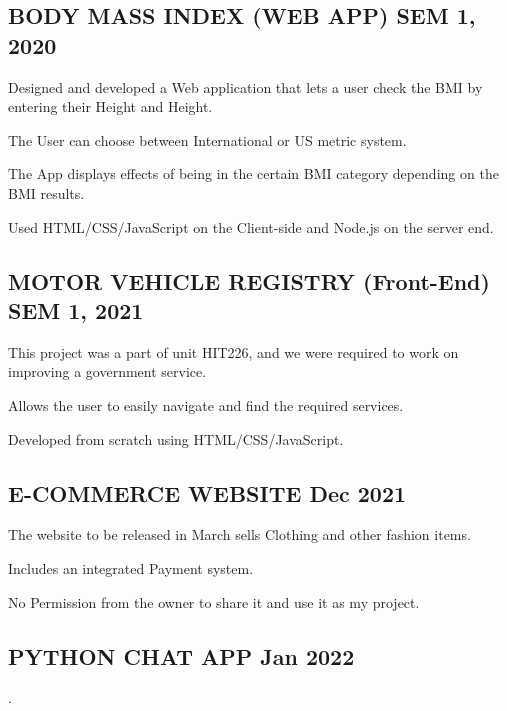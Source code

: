 \documentclass[letter,10pt]{article}
\begin{document}
\subsection{{BODY MASS INDEX (WEB APP) \hfill SEM 1, 2020}}
\begin{zitemize}
\item Designed and developed a Web application that lets a user check the BMI by entering their Height and Height.
\item The User can choose between International or US metric system.
\item The App displays effects of being in the certain BMI category depending on the BMI results.
\item Used HTML/CSS/JavaScript on the Client-side and Node.js on the server end.
\end{zitemize}

\subsection{{MOTOR VEHICLE REGISTRY (Front-End) \hfill SEM 1, 2021}}
\begin{zitemize}
\item This project was a part of unit HIT226, and we were required to work on improving a government service.
\item Allows the user to easily navigate and find the required services.
\item Developed from scratch using HTML/CSS/JavaScript.
\end{zitemize}

\subsection{{E-COMMERCE WEBSITE \hfill Dec 2021}}
\begin{zitemize}
\item The website to be released in March sells Clothing and other fashion items.
\item Includes an integrated Payment system.
\item No Permission from the owner to share it and use it as my project.
\end{zitemize}

\subsection{{PYTHON CHAT APP \hfill  Jan 2022}}
\begin{zitemize}
\item .
\end{zitemize}
\end{document}
